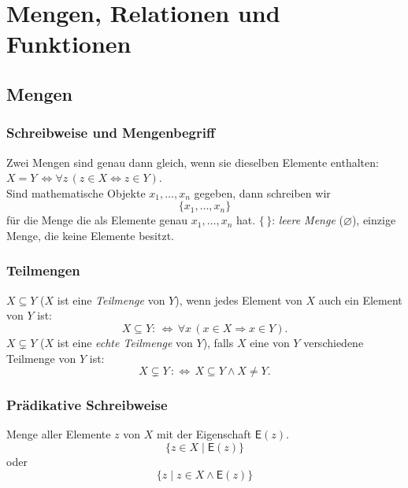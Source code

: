 \section{Mengen, Relationen und Funktionen}%
\label{sec:mengen_relationen_und_funktionen}
\subsection{Mengen}%
\label{sub:mengen}

\subsubsection{Schreibweise und Mengenbegriff}%
\label{ssub:schreibweise}
\begin{minipage}{0.9\linewidth}
Zwei Mengen sind genau dann gleich, wenn sie dieselben Elemente enthalten:
$X = Y\, \Leftrightarrow \forall z\, (z \in X \Leftrightarrow z \in Y)$. \\
Sind mathematische Objekte $x_1,\dots,x_n$ gegeben, dann schreiben wir
\[
\{x_1,\dots,x_n\}
\]
für die Menge die als Elemente genau $x_1,\dots,x_n$ hat.
$\{\,\}$: \textit{leere Menge} ($\varnothing$), einzige Menge, die keine Elemente besitzt. 
\end{minipage}

\subsubsection{Teilmengen}%
\label{ssub:teilm}
\begin{minipage}{0.9\linewidth}
$X\subseteq Y$ ($X$ ist eine \textit{Teilmenge} von $Y$), wenn jedes Element von $X$ auch ein Element von $Y$ ist:
\[
X\subseteq Y:\,\Leftrightarrow\,\forall x\,(x\in X\Rightarrow x\in Y).
\]
$X\subsetneq Y$ ($X$ ist eine \textit{echte Teilmenge} von $Y$), falls $X$ eine von $Y$ verschiedene Teilmenge von $Y$ ist:
\[
X\subsetneq Y\,:\Leftrightarrow\, X\subseteq Y\land X\neq Y.
\]
\end{minipage}

\subsubsection{Prädikative Schreibweise}%
\label{ssub:mengeneigenschaft}
\begin{minipage}{0.9\linewidth}
Menge aller Elemente $z$ von $X$ mit der Eigenschaft $\mathsf{E}(z)$.	
\[
\big\{z\in X\mid \mathsf{E}(z)\big\}
\]
oder
\[
\big\{z\mid z\in X\land\mathsf{E}(z)\big\}
\]
\end{minipage}

